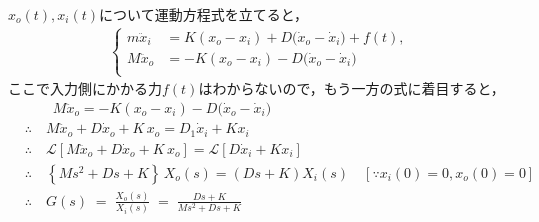 \documentclass[a4paper,12pt]{article}
\begin{document}
\begin{tcolorbox}
    \({x}_o(t),{x}_i(t)\)について運動方程式を立てると，
    \begin{align*}
        \left\{
            \begin{aligned}
                m\ddot{x}_i &= K(x_o - x_i) + D\bigl(\dot{x}_o-\dot{x}_i\bigr)+ f(t),\\
                M\ddot{x}_o &= - K(x_o - x_i) - D\bigl(\dot{x}_o-\dot{x}_i\bigr) \\
            \end{aligned}
        \right.
    \end{align*}
        ここで入力側にかかる力\(f(t)\)はわからないので，もう一方の式に着目すると，
    \begin{align*}
        &\qquad M\ddot{x}_o = - K(x_o - x_i) - D\bigl(\dot{x}_o-\dot{x}_i\bigr)  \\
        &\therefore \quad M\ddot{x}_o + D\dot{x}_o + K\,x_o = D_1 \dot{x}_i + K x_i\\
        &\therefore \quad \mathcal{L} \left[  M\ddot{x}_o + D \dot{x}_o + K\,x_o  \right] 
        =\mathcal{L} \left[ D \dot{x}_i + K x_i \right] \\
        &\therefore \quad \left\{M s^2 + D s + K\right\}\,X_o(s) 
        = (Ds+K)X_i(s) \quad [\because x_i(0)= 0, x_o(0)=0 ]\\
        &\therefore \quad G(s) \;=\;\frac{X_o(s)}{X_i(s)}
        \;=\;\frac{Ds+K}{M s^2 + Ds + K}
    \end{align*}

\end{tcolorbox}
\end{document}
